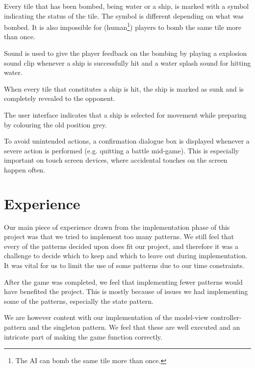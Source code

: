 Every tile that has been bombed, being water or a ship, is marked with a symbol indicating the status of the tile. The symbol is different depending on what was bombed. It is also impossible for (human\footnote{The AI can bomb the same tile more than once.}) players to bomb the same tile more than once.

Sound is used to give the player feedback on the bombing by playing a explosion sound clip whenever a ship is successfully hit and a water splash sound for hitting water.

When every tile that constitutes a ship is hit, the ship is marked as sunk and is completely revealed to the opponent.

The user interface indicates that a ship is selected for movement while preparing by colouring the old position grey.

To avoid unintended actions, a confirmation dialogue box is displayed whenever a severe action is performed (e.g. quitting a battle mid-game). This is especially important on touch screen devices, where accidental touches on the screen happen often.


\section{Experience} %
Our main piece of experience drawn from the implementation phase of this project was that we tried to implement too many patterns. We still feel that every of the patterns decided upon does fit our project, and therefore it was a challenge to decide which to keep and which to leave out during implementation. It was vital for us to limit the use of some patterns due to our time constraints.

After the game was completed, we feel that implementing fewer patterns would have benefited the project. This is mostly because of issues we had implementing some of the patterns, especially the state pattern.

We are however content with our implementation of the model-view controller-pattern and the singleton pattern. We feel that these are well executed and an intricate part of making the game function correctly.

